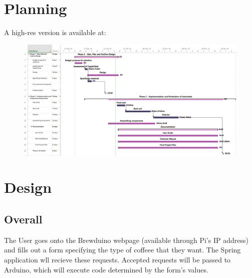 \documentclass[11pt, a4paper]{article}
\begin{document}
\section{Planning}
A high-res version is available at:
\begin{figure}[H]
    \centering    
    \includegraphics[angle=90, scale=0.5]{images/ProjectPlan}
\end{figure}

\newpage


\section{Design}


\subsection{Overall}
The User goes onto the Brewduino webpage (available through Pi's IP address) and 
fills out a form specifying the type of coffeee that they want. The Spring
application wll recieve these requests. Accepted requests will be passed to
Arduino, which will execute code determined by the form's values.
\end{document}
